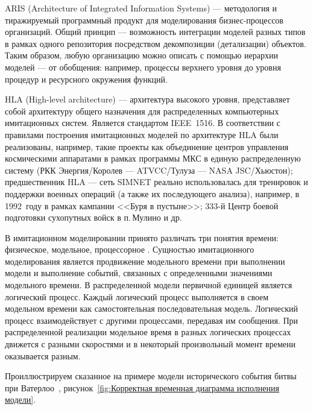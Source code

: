ARIS (Architecture of Integrated Information Systems)  ---  методология и тиражируемый программный продукт для моделирования бизнес-процессов организаций. Общий принцип --- возможность интеграции моделей разных типов в рамках одного репозитория посредством декомпозиции (детализации) объектов. Таким образом, любую организацию можно описать с помощью иерархии моделей --- от обобщения: например, процессы верхнего уровня до уровня процедур и ресурсного окружения функций.

HLA (High-level architecture) --- архитектура высокого уровня, представляет собой архитектуру общего назначения для распределенных компьютерных имитационных систем. Является стандартом IEEE~1516.
В соответствии с правилами построения имитационных моделей по архитектуре HLA были реализованы, например, такие проекты как объединение центров управления космическими аппаратами в рамках программы МКС в единую распределенную систему (РКК Энергия/Королев --- ATVCC/Тулуза --- NASA JSC/Хьюстон); предшественник HLA --- сеть SIMNET реально использовалась для тренировок и поддержки военных операций (а также их последующего анализа), например, в 1992~году в рамках кампании <<Буря в пустыне>>; 333-й Центр боевой подготовки сухопутных войск в п.\,Мулино и др.

В имитационном моделировании принято различать три понятия времени: физическое, модельное, процессорное \cite{okol}. Сущностью имитационного моделирования является продвижение модельного времени при выполнении модели и выполнение событий, связанных с определенными значениями модельного времени. В распределенной модели первичной единицей является логический процесс. Каждый логический процесс выполняется в своем модельном времени как самостоятельная последовательная модель. Логический процесс взаимодействует с другими процессами, передавая им сообщения. При распределенной реализации модельное время в разных логических процессах движется с разными скоростями и в некоторый произвольный момент времени оказывается разным.


Проиллюстрируем сказанное на примере модели исторического события битвы при Ватерлоо~\cite{napoleon}, рисунок~\ref{fig:Корректная временная диаграмма исполнения модели}.

